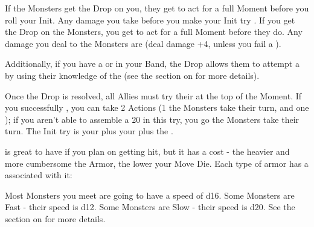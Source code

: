   If the Monsters get the Drop on you, they get to act for a full Moment before you roll your Init. Any damage you take before you make your Init try . If you get the Drop on the Monsters, you get to act for a full Moment before they do. Any damage you deal to the Monsters are  (deal \MAX damage +4, unless you fail a \RSTRY{\FOC}). 

Additionally, if you have a  or  in your Band, the Drop allows them to attempt a  by using their knowledge of the  (see the section on  for more details).


    Once the Drop is resolved, all Allies must try their  at the top of the Moment. If you successfully \RO, you can take 2 Actions (1  the Monsters take their turn, and one ); if you aren't able to assemble a 20 in this \RO try, you go  the Monsters take their turn. The Init try is your \INT plus your  plus the .




\newpage

   \MD

   is great to have if you plan on getting hit, but it has a cost - the heavier and more cumbersome the Armor, the lower your Move Die. Each type of armor has a \MD associated with it:




  Most Monsters you meet are going to have a speed of d16. Some Monsters are Fast - their speed is d12.  Some Monsters are Slow - their speed is d20.  See the section on  for more details.

